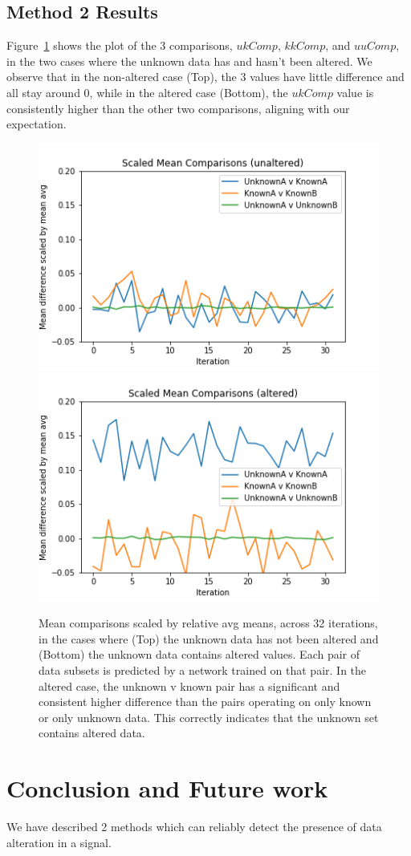\documentclass{acm_proc_article-sp}
\begin{document}
  \subsection{Method 2 Results}
  \label{subsec:method2results}
  
  Figure~\ref{fig.diff3Comp} shows the plot of the 3 comparisons, $ukComp$, $kkComp$, and $uuComp$, in the two cases where the unknown data has and hasn't been altered. We observe that in the non-altered case (Top), the 3 values have little difference and all stay around 0, while in the altered case (Bottom), the $ukComp$ value is consistently higher than the other two comparisons, aligning with our expectation.

  \begin{figure}[h]
    \centering
    \includegraphics[width=0.8\columnwidth]{images/diff3CompUnaltered.png}
    \includegraphics[width=0.8\columnwidth]{images/diff3Comp.png}
    \caption{Mean comparisons scaled by relative avg means, across 32 iterations, in the cases where (Top) the unknown data has not been altered and (Bottom) the unknown data contains altered values. Each pair of data subsets is predicted by a network trained on that pair. In the altered case, the unknown v known pair has a significant and consistent higher difference than the pairs operating on only known or only unknown data. This correctly indicates that the unknown set contains altered data.}
    \label{fig.diff3Comp}
    \end{figure}

  \section{Conclusion and Future work}
  \label{sec:conclusion}
  
  We have described 2 methods which can reliably detect the presence of data alteration in a signal.
  
  
  
  
  
\end{document}
